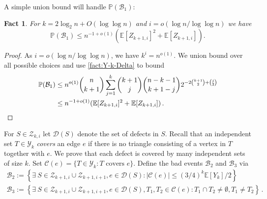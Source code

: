 \documentclass[11pt]{article}
\newtheorem{fact}[theorem]{Fact}
\theoremstyle{definition}
\theoremstyle{remark}
\newcommand{\cZ}{\mathcal{Z}}
\newcommand{\cY}{\mathcal{Y}}
\newcommand{\E}{\mathbb{E}}
\newcommand{\PP}{\mathbb{P}}
\newcommand{\cC}{\mathcal{C}}
\newcommand{\cD}{\mathcal{D}}
\newcommand{\cB}{\mathcal{B}}
\begin{document}
A simple union bound will handle $\PP(\cB_1)$:
\begin{fact}\label{fact:Z_k-disjoint}
    For $k = 2 \log_2 n + O(\log \log n)$ and $i = o(\log n / \log\log n)$ we have $$\PP(\cB_1) \leq n^{-1+o(1)}( \E [Z_{k+1,i}]^2 + \E [Z_{k+1,i}]).$$
\end{fact}
\begin{proof}
    As $i= o(\log n /\log\log n)$, we have $k^i=n^{o(1)}$. We union bound over all possible choices and use  \cref{fact:Y-k-Delta} to bound \begin{align*}
    \PP(\cB_1) &\leq n^{o(1)}  \binom{n}{k+1} \sum_{j = 1}^{k} \binom{k+1}{j} \binom{n-k-1}{k+1-j} 2^{-2\binom{k+1}{2} + \binom{j}{2}} \\
    &\leq n^{-1 + o(1)} ( \E [Z_{k+1,i}]^2 + \E [Z_{k+1,i}])\,. \qedhere
    \end{align*}
\end{proof}




For $S \in \cZ_{k,i}$ let $\cD(S)$ denote the set of defects in $S$.  Recall that an independent set $T \in \cY_k$ \emph{covers} an edge $e$ if there is no triangle consisting of a vertex in $T$ together with $e$.  
We prove that each defect is covered by many independent sets of size $k$. Set $\cC(e) = \{T \in \cY_k : T \text{ covers }e\}$.  Define the bad events $\cB_2$ and $\cB_3$ via \begin{gather*}
    \cB_2 := \left\{\exists~S \in \cZ_{k+1,i} \cup \cZ_{k+1,i+1}, e \in \cD(S) : |\cC(e)| \leq (3/4)^k \E [Y_k] / 2 \right\} \\
    \cB_3 := \left\{\exists~S \in \cZ_{k+1,i} \cup \cZ_{k+1, i+1}, e \in \cD(S), T_1, T_2 \in \cC(e) : T_1 \cap T_2 \neq \emptyset, T_1 \neq T_2\right\}\,.
\end{gather*}
\end{document}
